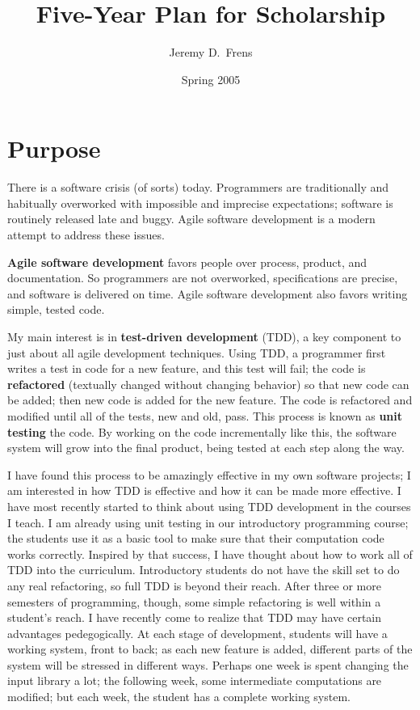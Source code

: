 \documentclass{article}
\title{Five-Year Plan for Scholarship}
\author{Jeremy D.\ Frens}
\date{Spring 2005}
\newcommand{\term}[1]{\textbf{#1}}
\begin{document}
\maketitle

\section*{Purpose}

There is a software crisis (of sorts) today.  Programmers are traditionally and habitually overworked with impossible and imprecise expectations; software is routinely released late and buggy.  Agile software development is a modern attempt to address these issues.

\term{Agile software development} favors people over process, product, and documentation.  So programmers are not overworked, specifications are precise, and software is delivered on time.  Agile software development also favors writing simple, tested code.

My main interest is in \term{test-driven development} (TDD), a key component to just about all agile development techniques.  Using TDD, a programmer first writes a test in code for a new feature, and this test will fail; the code is \term{refactored} (textually changed without changing behavior) so that new code can be added; then new code is added for the new feature.  The code is refactored and modified until all of the tests, new and old, pass.  This process is known as \term{unit testing} the code.  By working on the code incrementally like this, the software system will grow into the final product, being tested at each step along the way.

I have found this process to be amazingly effective in my own software projects; I am interested in how TDD is effective and how it can be made more effective.  I have most recently started to think about using TDD development in the courses I teach.  I am already using unit testing in our introductory programming course; the students use it as a basic tool to make sure that their computation code works correctly.  Inspired by that success, I have thought about how to work all of TDD into the curriculum.  Introductory students do not have the skill set to do any real refactoring, so full TDD is beyond their reach.  After three or more semesters of programming, though, some simple refactoring is well within a student's reach.  I have recently come to realize that TDD may have certain advantages pedegogically.  At each stage of development, students will have a working system, front to back; as each new feature is added, different parts of the system will be stressed in different ways.  Perhaps one week is spent changing the input library a lot; the following week, some intermediate computations are modified; but each week, the student has a complete working system.
\end{document}
